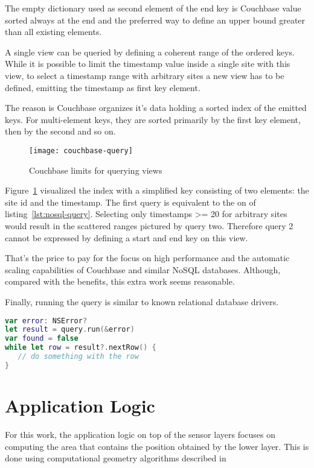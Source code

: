 The empty dictionary used as second element of the end key is Couchbase value sorted always at the end and the preferred way to define an upper bound greater than all existing elements.

A single view can be queried by defining a coherent range of the ordered keys. While it is possible to limit the timestamp value inside a single site with this view, to select a timestamp range with arbitrary sites a new view has to be defined, emitting the timestamp as first key element.

The reason is Couchbase organizes it's data holding a sorted index of the emitted keys. For multi-element keys, they are sorted primarily by the first key element, then by the second and so on.

\begin{figure}[H]
\centering
\texttt{[image: couchbase-query]}
\caption{Couchbase limits for querying views}
\label{fig:couchbase-query}
\end{figure}

Figure~\ref{fig:couchbase-query} visualized the index with a simplified key consisting of two elements: the site id and the timestamp. The first query is equivalent to the on of listing~\ref{lst:nosql-query}. Selecting only timestamps >= 20 for arbitrary sites would result in the scattered ranges pictured by query two. Therefore query 2 cannot be expressed by defining a start and end key on this view.

That's the price to pay for the focus on high performance and the automatic scaling capabilities of Couchbase and similar NoSQL databases. Although, compared with the benefits, this extra work seems reasonable.

Finally, running the query is similar to known relational database drivers. 

\begin{lstlisting}[basicstyle=\footnotesize,caption=Performing the NoSQL query,language=Swift]
var error: NSError?
let result = query.run(&error)
var found = false
while let row = result?.nextRow() {
   // do something with the row
}
\end{lstlisting}


\section{Application Logic}

For this work, the application logic on top of the sensor layers focuses on computing the area that contains the position obtained by the lower layer. This is done using computational geometry algorithms described in  %



